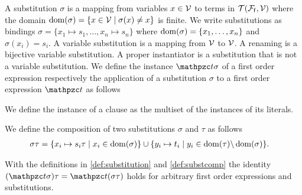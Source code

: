 


\begin{definition}\label{def:substitution}
	A {\myem substitution} $\sigma$ is a mapping from variables $x\in{\mathcal V}$ to terms in ${{\mathcal T}({\mathcal F}_{\mathsf f},{\mathcal V})}$
	where the {\myem domain }$\operatorname{dom}(\sigma) = \{ x\in{\mathcal V}\mid\sigma(x) \neq x \}$ is finite.
	We write substitutions as bindings $\sigma=\{ x_1\mapsto s_1,\ldots,x_n\mapsto s_n \}$
	where $\operatorname{dom}(\sigma)=\{ x_1,\ldots,x_n \}$ and $\sigma(x_i)=s_i$.
	A {\myem variable substitution} is a mapping from ${\mathcal V}$ to ${\mathcal V}$.
	A {\myem renaming} is a bijective variable substitution.
	A {\myem proper instantiator} is a substitution that is not a variable substitution.
	We define the instance $\mct\sigma$ of a first order expression
	respectively the application of a substitution $\sigma$ to a first order expression $\mct$ as follows

\noindent We define the instance of a clause as the multiset of the instances of its literals.
\end{definition}

\begin{definition}\label{def:substcomp}
We define the {\myem composition} of two substitutions $\sigma$ and $\tau$ as follows
	\begin{align*}
		\sigma\tau&=\{ x_i\mapsto s_i\tau\mid x_i\in\operatorname{dom}(\sigma) \}
		\cup
		\{ y_i\mapsto t_i\mid y_i\in\operatorname{dom}(\tau) \backslash \operatorname{dom}(\sigma) \}.
	\end{align*}
\end{definition}



\begin{lemma}\label{lem:substitution}
	With the definitions in \ref{def:substitution} and \ref{def:substcomp} the identity
	$(\mct\sigma)\tau = \mct(\sigma\tau)$ holds for
	arbitrary first order expressions and substitutions.
\end{lemma}